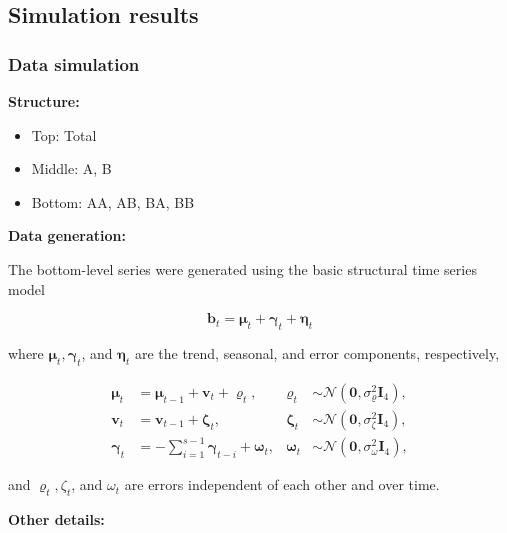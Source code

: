 \documentclass[
  letterpaper,
  DIV=11,
  numbers=noendperiod]{scrartcl}
\providecommand{\tightlist}{%
  \setlength{\itemsep}{0pt}\setlength{\parskip}{0pt}}\usepackage{longtable,booktabs,array}
\begin{document}
\hypertarget{simulation-results}{%
\subsection{Simulation results}\label{simulation-results}}

\hypertarget{data-simulation}{%
\subsubsection{Data simulation}\label{data-simulation}}

\textbf{Structure:}

\begin{itemize}
\tightlist
\item
  Top: Total
\item
  Middle: A, B
\item
  Bottom: AA, AB, BA, BB
\end{itemize}

\textbf{Data generation:}

The bottom-level series were generated using the basic structural time
series model

\[
\boldsymbol{b}_t=\boldsymbol{\mu}_t+\boldsymbol{\gamma}_t+\boldsymbol{\eta}_t
\]

where \(\boldsymbol{\mu}_t, \boldsymbol{\gamma}_t\), and
\(\boldsymbol{\eta}_t\) are the trend, seasonal, and error components,
respectively,

\[
\begin{aligned}
\boldsymbol{\mu}_t & =\boldsymbol{\mu}_{t-1}+\boldsymbol{v}_t+\boldsymbol{\varrho}_t, & \boldsymbol{\varrho}_t & \sim \mathcal{N}\left(\mathbf{0}, \sigma_{\varrho}^2 \boldsymbol{I}_4\right), \\
\boldsymbol{v}_t & =\boldsymbol{v}_{t-1}+\boldsymbol{\zeta}_t, & \boldsymbol{\zeta}_t & \sim \mathcal{N}\left(\mathbf{0}, \sigma_\zeta^2 \boldsymbol{I}_4\right), \\
\boldsymbol{\gamma}_t & =-\sum_{i=1}^{s-1} \boldsymbol{\gamma}_{t-i}+\boldsymbol{\omega}_t, & \boldsymbol{\omega}_t & \sim \mathcal{N}\left(\mathbf{0}, \sigma_\omega^2 \mathbf{I}_4\right),
\end{aligned}
\]

and \(\varrho_t, \zeta_t\), and \(\omega_t\) are errors independent of
each other and over time.

\textbf{Other details:}
\end{document}

